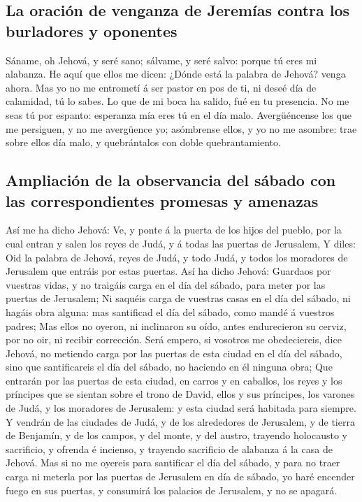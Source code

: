 \hypertarget{la-oraciuxf3n-de-venganza-de-jeremuxedas-contra-los-burladores-y-oponentes}{%
\subsection{La oración de venganza de Jeremías contra los burladores y
oponentes}\label{la-oraciuxf3n-de-venganza-de-jeremuxedas-contra-los-burladores-y-oponentes}}

 Sáname, oh Jehová, y seré sano; sálvame, y seré salvo:
porque tú eres mi alabanza.  He aquí que ellos me dicen:
¿Dónde está la palabra de Jehová? venga ahora.  Mas yo no
me entrometí á ser pastor en pos de ti, ni deseé día de calamidad, tú lo
sabes. Lo que de mi boca ha salido, fué en tu presencia. 
No me seas tú por espanto: esperanza mía eres tú en el día malo.
 Avergüéncense los que me persiguen, y no me avergüence yo;
asómbrense ellos, y yo no me asombre: trae sobre ellos día malo, y
quebrántalos con doble quebrantamiento.

\hypertarget{ampliaciuxf3n-de-la-observancia-del-suxe1bado-con-las-correspondientes-promesas-y-amenazas}{%
\subsection{Ampliación de la observancia del sábado con las
correspondientes promesas y
amenazas}\label{ampliaciuxf3n-de-la-observancia-del-suxe1bado-con-las-correspondientes-promesas-y-amenazas}}

 Así me ha dicho Jehová: Ve, y ponte á la puerta de los
hijos del pueblo, por la cual entran y salen los reyes de Judá, y á
todas las puertas de Jerusalem,  Y diles: Oid la palabra de
Jehová, reyes de Judá, y todo Judá, y todos los moradores de Jerusalem
que entráis por estas puertas.  Así ha dicho Jehová:
Guardaos por vuestras vidas, y no traigáis carga en el día del sábado,
para meter por las puertas de Jerusalem;  Ni saquéis carga
de vuestras casas en el día del sábado, ni hagáis obra alguna: mas
santificad el día del sábado, como mandé á vuestros padres;
 Mas ellos no oyeron, ni inclinaron su oído, antes
endurecieron su cerviz, por no oir, ni recibir corrección. 
Será empero, si vosotros me obedeciereis, dice Jehová, no metiendo carga
por las puertas de esta ciudad en el día del sábado, sino que
santificareis el día del sábado, no haciendo en él ninguna obra;
 Que entrarán por las puertas de esta ciudad, en carros y
en caballos, los reyes y los príncipes que se sientan sobre el trono de
David, ellos y sus príncipes, los varones de Judá, y los moradores de
Jerusalem: y esta ciudad será habitada para siempre.  Y
vendrán de las ciudades de Judá, y de los alrededores de Jerusalem, y de
tierra de Benjamín, y de los campos, y del monte, y del austro, trayendo
holocausto y sacrificio, y ofrenda é incienso, y trayendo sacrificio de
alabanza á la casa de Jehová.  Mas si no me oyereis para
santificar el día del sábado, y para no traer carga ni meterla por las
puertas de Jerusalem en día de sábado, yo haré encender fuego en sus
puertas, y consumirá los palacios de Jerusalem, y no se apagará.

